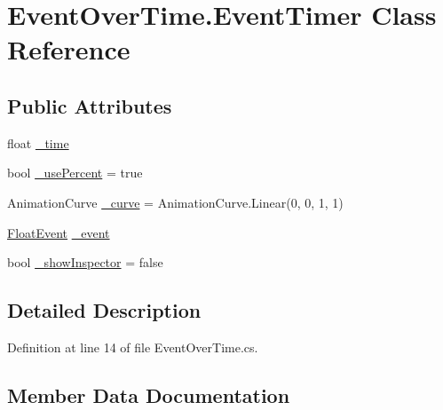 \hypertarget{class_event_over_time_1_1_event_timer}{}\section{Event\+Over\+Time.\+Event\+Timer Class Reference}
\label{class_event_over_time_1_1_event_timer}
\subsection*{Public Attributes}
\begin{DoxyCompactItemize}
\item 
float \mbox{\hyperlink{class_event_over_time_1_1_event_timer_ab043c1dda4b51932f9819292db72252b}{\+\_\+time}}
\item 
bool \mbox{\hyperlink{class_event_over_time_1_1_event_timer_a340cce92f5d7e5dde506511c56df9ea1}{\+\_\+use\+Percent}} = true
\item 
Animation\+Curve \mbox{\hyperlink{class_event_over_time_1_1_event_timer_a5fc2cfbcc97195f57a64c4888c7593be}{\+\_\+curve}} = Animation\+Curve.\+Linear(0, 0, 1, 1)
\item 
\mbox{\hyperlink{class_float_event}{Float\+Event}} \mbox{\hyperlink{class_event_over_time_1_1_event_timer_a7a1f2ed69b2d1f6680773f64c4b823cc}{\+\_\+event}}
\item 
bool \mbox{\hyperlink{class_event_over_time_1_1_event_timer_a3b407984d2eeaffacb6ed074aae796e9}{\+\_\+show\+Inspector}} = false
\end{DoxyCompactItemize}


\subsection{Detailed Description}


Definition at line 14 of file Event\+Over\+Time.\+cs.



\subsection{Member Data Documentation}
\mbox{\label{class_event_over_time_1_1_event_timer_a5fc2cfbcc97195f57a64c4888c7593be}} 
